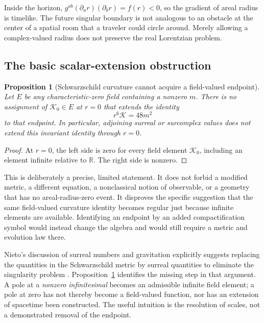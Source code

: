 \documentclass[11pt,a4paper]{article}
\numberwithin{equation}{section}
\newtheorem{proposition}[theorem]{Proposition}
\theoremstyle{definition}
\theoremstyle{remark}
\newcommand{\R}{\mathbb R}
\newcommand{\Krets}{\mathcal K}
\begin{document}
Inside the horizon, $g^{ab}(\partial_a r)(\partial_b r)=f(r)<0$, so the gradient of areal radius is timelike. The future singular boundary is not analogous to an obstacle at the center of a spatial room that a traveler could circle around. Merely allowing a complex-valued radius does not preserve the real Lorentzian problem.

\subsection{The basic scalar-extension obstruction}
\begin{proposition}[Schwarzschild curvature cannot acquire a field-valued endpoint]\label{prop:noendpoint}
Let $E$ be any characteristic-zero field containing a nonzero $m$. There is no assignment of $\Krets_0\in E$ at $r=0$ that extends the identity
\begin{equation}\label{eq:invariantidentity}
 r^6\Krets=48m^2
\end{equation}
to that endpoint. In particular, adjoining surreal or surcomplex values does not extend this invariant identity through $r=0$.
\end{proposition}
\begin{proof}
At $r=0$, the left side is zero for every field element $\Krets_0$, including an element infinite relative to $\R$. The right side is nonzero.
\end{proof}

This is deliberately a precise, limited statement. It does not forbid a modified metric, a different equation, a nonclassical notion of observable, or a geometry that has no areal-radius-zero event. It disproves the specific suggestion that the same field-valued curvature identity becomes regular just because infinite elements are available. Identifying an endpoint by an added compactification symbol would instead change the algebra and would still require a metric and evolution law there.

Nieto's discussion of surreal numbers and gravitation explicitly suggests replacing the quantities in the Schwarzschild metric by surreal quantities to eliminate the singularity problem \cite{Nieto}. Proposition~\ref{prop:noendpoint} identifies the missing step in that argument. A pole at a \emph{nonzero infinitesimal} becomes an admissible infinite field element; a pole at zero has not thereby become a field-valued function, nor has an extension of spacetime been constructed. The useful intuition is the resolution of scales, not a demonstrated removal of the endpoint.
\end{document}
